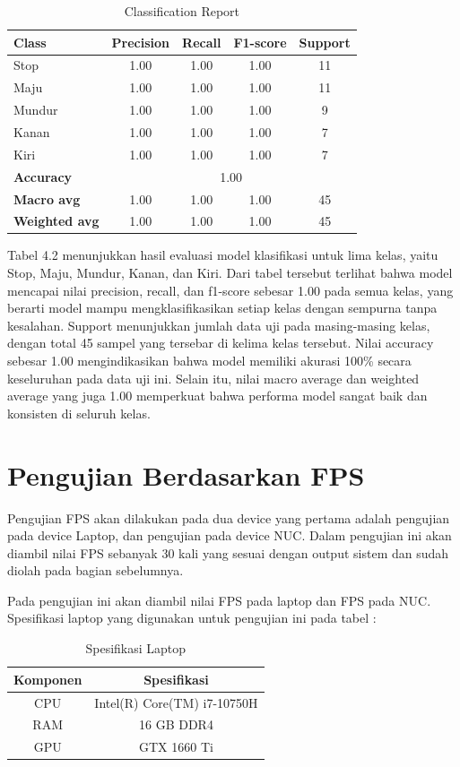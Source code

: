 \begin{table}[h!]
\centering
\caption{Classification Report}
\begin{tabular}{lcccc}
\hline
\textbf{Class} & \textbf{Precision} & \textbf{Recall} & \textbf{F1-score} & \textbf{Support} \\
\hline
Stop   & 1.00 & 1.00 & 1.00 & 11 \\
Maju   & 1.00 & 1.00 & 1.00 & 11 \\
Mundur & 1.00 & 1.00 & 1.00 & 9  \\
Kanan  & 1.00 & 1.00 & 1.00 & 7  \\
Kiri   & 1.00 & 1.00 & 1.00 & 7  \\
\hline
\textbf{Accuracy}     & \multicolumn{4}{c}{1.00} \\
\textbf{Macro avg}    & 1.00 & 1.00 & 1.00 & 45 \\
\textbf{Weighted avg} & 1.00 & 1.00 & 1.00 & 45 \\
\hline
\end{tabular}
\end{table}

Tabel 4.2 menunjukkan hasil evaluasi model klasifikasi untuk lima kelas, yaitu Stop, Maju, Mundur, Kanan, dan Kiri. Dari tabel tersebut terlihat bahwa model mencapai nilai precision, recall, dan f1-score sebesar 1.00 pada semua kelas, 
yang berarti model mampu mengklasifikasikan setiap kelas dengan sempurna tanpa kesalahan. Support menunjukkan jumlah data uji pada masing-masing kelas, dengan total 45 sampel yang tersebar di kelima kelas tersebut. Nilai accuracy sebesar 1.00 
mengindikasikan bahwa model memiliki akurasi 100\% secara keseluruhan pada data uji ini. Selain itu, nilai macro average dan weighted average yang juga 1.00 memperkuat bahwa performa model sangat baik dan konsisten di seluruh kelas.

\section{Pengujian Berdasarkan FPS}
Pengujian FPS akan dilakukan pada dua device yang pertama adalah pengujian pada device Laptop, dan pengujian pada device NUC. Dalam pengujian ini akan diambil nilai FPS sebanyak 30 kali yang sesuai dengan output sistem dan sudah diolah pada bagian sebelumnya.

Pada pengujian ini akan diambil nilai FPS pada laptop dan FPS pada NUC. Spesifikasi laptop yang digunakan untuk pengujian ini pada tabel  :

\begin{longtable}{|c|c|}
  \caption{Spesifikasi Laptop}
  \label{tb:Spesifikasi Laptop}                                   \\
  \hline
  \rowcolor[HTML]{C0C0C0}
  \textbf{Komponen} & \textbf{Spesifikasi}  \\
  \hline
  CPU            & Intel(R) Core(TM) i7-10750H        \\ \hline
  RAM            & 16 GB DDR4       \\ \hline
  GPU            & GTX 1660 Ti         \\ \hline
  \hline
\end{longtable}

